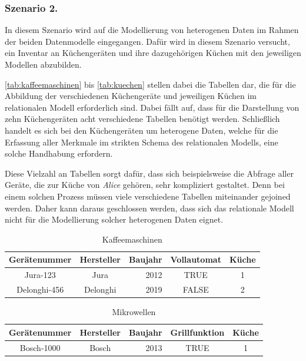 \subsubsection{Szenario 2.}
In diesem Szenario wird auf die Modellierung von heterogenen Daten im Rahmen der beiden Datenmodelle eingegangen. Dafür wird in diesem Szenario versucht, ein Inventar an Küchengeräten und ihre dazugehörigen Küchen mit den jeweiligen Modellen abzubilden. 

\autoref{tab:kaffeemaschinen} bis \autoref{tab:kuechen} stellen dabei die Tabellen dar, die für die Abbildung der verschiedenen Küchengeräte und jeweiligen Küchen im relationalen Modell erforderlich sind. Dabei fällt auf, dass für die Darstellung von zehn Küchengeräten acht verschiedene Tabellen benötigt werden. Schließlich handelt es sich bei den Küchengeräten um heterogene Daten, welche für die Erfassung aller Merkmale im strikten Schema des relationalen Modells, eine solche Handhabung erfordern. 

Diese Vielzahl an Tabellen sorgt dafür, dass sich beispielsweise die Abfrage aller Geräte, die zur Küche von \textit{Alice} gehören, sehr kompliziert gestaltet. Denn bei einem solchen Prozess müssen viele verschiedene Tabellen miteinander gejoined werden. Daher kann daraus geschlossen werden, dass sich das relationale Modell nicht für die Modellierung solcher heterogenen Daten eignet.

\begin{table}[!ht]
    \centering
    \begin{tabular}{c|c|r|c|c}
    \hline
    \rowcolor[HTML]{EFEFEF} 
    \textbf{Gerätenummer} & \textbf{Hersteller} & \multicolumn{1}{c|}{\cellcolor[HTML]{EFEFEF}\textbf{Baujahr}} & \textbf{Vollautomat} & \textbf{Küche} \\ \hline
    Jura-123 & Jura & 2012 & TRUE & 1 \\
    Delonghi-456 & Delonghi & 2019 & FALSE & 2 \\ \hline
    \end{tabular}
    \caption{Kaffeemaschinen}
    \label{tab:kaffeemaschinen}
\end{table}

\begin{table}[!ht]
    \centering
    \begin{tabular}{c|c|c|c|c}
    \hline
    \rowcolor[HTML]{EFEFEF} 
    \textbf{Gerätenummer} & \textbf{Hersteller} & \textbf{Baujahr} & \textbf{Grillfunktion} & \textbf{Küche} \\ \hline
    Bosch-1000 & Bosch & \multicolumn{1}{r|}{2013} & TRUE & 1 \\ \hline
    \end{tabular}
    \caption{Mikrowellen}
    \label{tab:mikrowellen}
\end{table}

